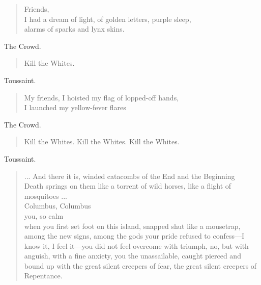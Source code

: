 \documentclass[letterpaper,article,12pt,oneside,notitlepage]{memoir}
\begin{document}
\begin{verse}
\hspace{1cm} Friends, \\
I had a dream of light, of golden letters, purple sleep, \\
alarms of sparks and lynx skins. \\
\end{verse}

\begin{center}The Crowd.\end{center}

\begin{verse}
\hspace{1cm} Kill the Whites. \\
\end{verse}

\begin{center}Toussaint.\end{center}

\begin{verse}
\hspace{1cm} My friends, I hoisted my flag of lopped-off hands, \\
I launched my yellow-fever flares \\
\end{verse}

\begin{center}The Crowd.\end{center}

\begin{verse}
\hspace{1cm} Kill the Whites. Kill the Whites. Kill the Whites. \\
\end{verse}

\begin{center}Toussaint.\end{center}

\begin{verse}
\hspace{1cm} ... And there it is, winded catacombs of the End and the Beginning \\
Death springs on them like a torrent of wild horses, like a flight of mosquitoes ... \\
Columbus, Columbus \\
you, so calm \\
when you first set foot on this island, snapped shut like a mousetrap, \\
among the new signs, among the gods your pride refused to confess---I know it, I feel it---you did not feel overcome with triumph, no, but with anguish, with a fine anxiety, you the unassailable, caught pierced and bound up with the great silent creepers of fear, the great silent creepers of Repentance. \\
\end{verse}
\end{document}
